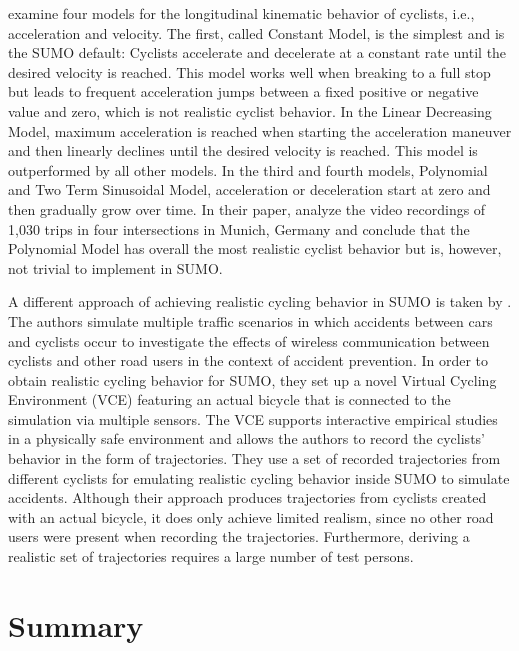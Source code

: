 \textcite{twaddle2016modeling} examine four models for the longitudinal kinematic behavior of cyclists, i.e., acceleration and velocity.
The first, called Constant Model, is the simplest and is the SUMO default:
Cyclists accelerate and decelerate at a constant rate until the desired velocity is reached.
This model works well when breaking to a full stop but leads to frequent acceleration jumps between a fixed positive or negative value and zero, which is not realistic cyclist behavior.
In the Linear Decreasing Model, maximum acceleration is reached when starting the acceleration maneuver and then linearly declines until the desired velocity is reached.
This model is outperformed by all other models.
In the third and fourth models, Polynomial and Two Term Sinusoidal Model, acceleration or deceleration start at zero and then gradually grow over time.
In their paper, \textcite{twaddle2016modeling} analyze the video recordings of 1,030 trips in four intersections in Munich, Germany and conclude that the Polynomial Model has overall the most realistic cyclist behavior but is, however, not trivial to implement in SUMO.

A different approach of achieving realistic cycling behavior in SUMO is taken by \textcite{heinovski2019modeling}.
The authors simulate multiple traffic scenarios in which accidents between cars and cyclists occur to investigate the effects of wireless communication between cyclists and other road users in the context of accident prevention.
In order to obtain realistic cycling behavior for SUMO, they set up a novel Virtual Cycling Environment (VCE) featuring an actual bicycle that is connected to the simulation via multiple sensors.
The VCE supports interactive empirical studies in a physically safe environment and allows the authors to record the cyclists' behavior in the form of trajectories.
They use a set of recorded trajectories from different cyclists for emulating realistic cycling behavior inside SUMO to simulate accidents.
Although their approach produces trajectories from cyclists created with an actual bicycle, it does only achieve limited realism, since no other road users were present when recording the trajectories.
Furthermore, deriving a realistic set of trajectories requires a large number of test persons.


\section{Summary}
\label{sec:summary_sumo}


